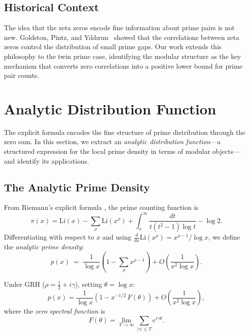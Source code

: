 \documentclass[11pt,a4paper]{article}
\theoremstyle{remark}
\begin{document}
\subsection{Historical Context}

The idea that the zeta zeros encode fine information about prime pairs is not new.
Goldston, Pintz, and Y{\i}ld{\i}r{\i}m~\cite{GPY2005} showed that the correlations between zeta zeros control the distribution of small prime gaps.
Our work extends this philosophy to the twin prime case, identifying the modular structure as the key mechanism that converts zero correlations into a positive lower bound for prime pair counts.

\section{Analytic Distribution Function}\label{sec:distribution}

The explicit formula encodes the fine structure of prime distribution through the zero sum.
In this section, we extract an \emph{analytic distribution function}---a structured expression for the local prime density in terms of modular objects---and identify its applications.

\subsection{The Analytic Prime Density}

From Riemann's explicit formula \cite{Edwards1974}, the prime counting function is
\begin{equation}\label{eq:riemann_pi}
\pi(x) = \mathrm{Li}(x) - \sum_{\rho} \mathrm{Li}(x^{\rho}) + \int_x^{\infty} \frac{dt}{t(t^2-1)\log t} - \log 2.
\end{equation}
Differentiating with respect to $x$ and using $\frac{d}{dx}\mathrm{Li}(x^{\rho}) = x^{\rho-1}/\log x$, we define the \emph{analytic prime density}:
\begin{equation}\label{eq:prime_density}
\boxed{p(x) \;=\; \frac{1}{\log x}\!\left(1 - \sum_{\rho} x^{\rho - 1}\right) + O\!\left(\frac{1}{x^2 \log x}\right).}
\end{equation}

Under GRH ($\rho = \tfrac{1}{2}+i\gamma$), setting $\theta = \log x$:
\begin{equation}\label{eq:density_grh}
p(x) = \frac{1}{\log x}\left(1 - x^{-1/2}\, F(\theta)\right) + O\!\left(\frac{1}{x^2 \log x}\right),
\end{equation}
where the \emph{zero spectral function} is
\begin{equation}\label{eq:spectral}
F(\theta) = \lim_{T\to\infty} \sum_{|\gamma|\le T} e^{i\gamma \theta}.
\end{equation}
\end{document}
